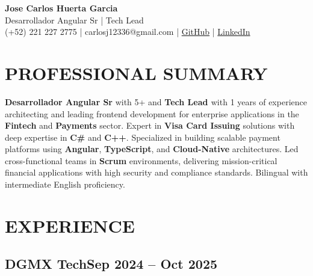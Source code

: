 \documentclass[a4paper,10pt]{article}
\newcommand{\kw}[1]{\textbf{\textcolor{keyword}{#1}}}
\begin{document}
\begin{center}
{\bfseries\LARGE Jose Carlos Huerta Garcia} \\
Desarrollador Angular Sr | Tech Lead \\
(+52) 221 227 2775 | carlosj12336@gmail.com | \href{https://github.com/jcarloshg}{GitHub} | \href{https://www.linkedin.com/in/jose-carlos-huerta-garcia-773952212}{LinkedIn}
\end{center}

\section*{PROFESSIONAL SUMMARY}
\kw{Desarrollador Angular Sr} with 5+ and \kw{Tech Lead } with 1 years of experience architecting and leading frontend development for enterprise applications in the \kw{Fintech} and \kw{Payments} sector. Expert in \kw{Visa Card Issuing} solutions with deep expertise in \kw{C\#} and \kw{C++}. Specialized in building scalable payment platforms using \kw{Angular}, \kw{TypeScript}, and \kw{Cloud-Native} architectures. Led cross-functional teams in \kw{Scrum} environments, delivering mission-critical financial applications with high security and compliance standards. Bilingual with intermediate English proficiency.

\section*{EXPERIENCE}

\subsection*{\small DGMX Tech\hfill\textbf{Sep 2024 -- Oct 2025}}
\end{document}
